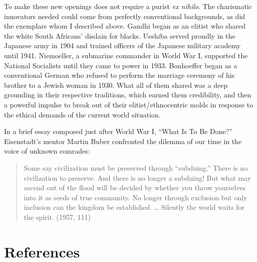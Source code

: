 To make these new openings does not require a purist \emph{ex nihilo}. The charismatic innovators needed could come from perfectly conventional backgrounds, as did the exemplars whom I described above. Gandhi began as an elitist who shared the white South Africans' disdain for blacks. Ueshiba served proudly in the Japanese army in 1904 and trained officers of the Japanese military academy until 1941. Niemoeller, a submarine commander in World War I, supported the National Socialists until they came to power in 1933. Bonhoeffer began as a conventional German who refused to perform the marriage ceremony of his brother to a Jewish woman in 1930. What all of them shared was a deep grounding in their respective traditions, which earned them credibility, and then a powerful impulse to break out of their elitist/ethnocentric molds in response to the ethical demands of the current world situation. 

In a brief essay composed just after World War I, ``What Is To Be Done?'' Eisenstadt's mentor Martin Buber confronted the dilemma of our time in the voice of unknown comrades:

\begin{quote}
Some say civilization must be preserved through ``subduing.'' There is no civilization to preserve. And there is no longer a subduing! But what may ascend out of the flood will be decided by whether you throw yourselves into it as seeds of true community. No longer through exclusion but only inclusion can the kingdom be established. \ldots{} Silently the world waits for the spirit. (1957, 111)
\end{quote}

\section*{References}

